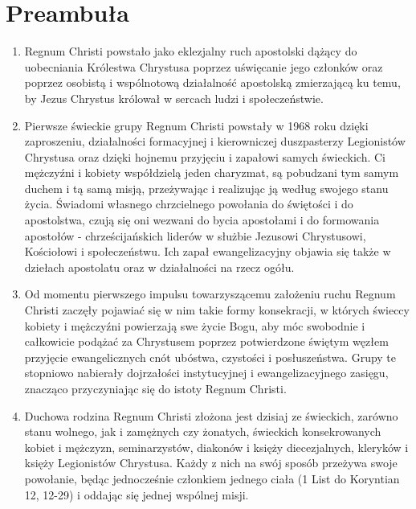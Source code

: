 \section*{Preambuła}
\begin{enumerate}


\item Regnum Christi powstało jako eklezjalny ruch apostolski dążący do uobecniania Królestwa Chrystusa poprzez uświęcanie jego członków oraz poprzez osobistą i wspólnotową działalność apostolską zmierzającą ku temu, by Jezus Chrystus królował w sercach ludzi i społeczeństwie. 


\item Pierwsze świeckie grupy Regnum Christi powstały w 1968 roku dzięki zaproszeniu, działalności formacyjnej i kierowniczej duszpasterzy Legionistów Chrystusa oraz dzięki hojnemu przyjęciu i zapałowi samych świeckich. Ci mężczyźni i kobiety współdzielą jeden charyzmat, są pobudzani tym samym duchem i tą samą misją, przeżywając i realizując ją według swojego stanu życia. Świadomi własnego chrzcielnego powołania do świętości i do apostolstwa, czują się oni wezwani do bycia apostołami i do formowania apostołów - chrześcijańskich liderów w służbie Jezusowi Chrystusowi, Kościołowi i społeczeństwu. Ich zapał ewangelizacyjny objawia się także w dziełach apostolatu oraz w działalności na rzecz ogółu.


\item Od momentu pierwszego impulsu towarzyszącemu założeniu ruchu Regnum Christi zaczęły pojawiać się w nim takie formy konsekracji, w których świeccy kobiety i mężczyźni powierzają swe życie Bogu, aby móc swobodnie i całkowicie podążać za Chrystusem poprzez potwierdzone świętym węzłem przyjęcie ewangelicznych cnót ubóstwa, czystości i posłuszeństwa. Grupy te stopniowo nabierały dojrzałości instytucyjnej i ewangelizacyjnego zasięgu, znacząco przyczyniając się do istoty Regnum Christi.


\item Duchowa rodzina Regnum Christi złożona jest dzisiaj ze świeckich, zarówno stanu wolnego, jak i zamężnych czy żonatych, świeckich konsekrowanych kobiet i mężczyzn, seminarzystów, diakonów i księży diecezjalnych, kleryków i księży Legionistów Chrystusa. Każdy z nich na swój sposób przeżywa swoje powołanie, będąc jednocześnie członkiem jednego ciała (1 List do Koryntian 12, 12-29) i oddając się jednej wspólnej misji.



\end{enumerate}
